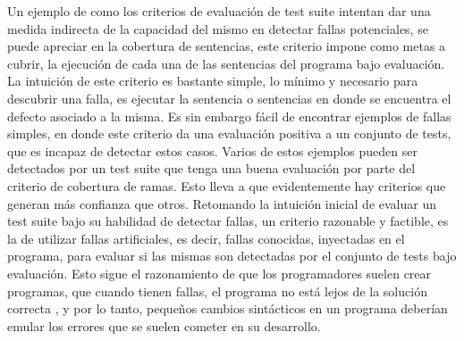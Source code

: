 Un ejemplo de como los criterios de evaluaci\'on de test suite intentan dar una medida indirecta de la capacidad del mismo en detectar fallas potenciales, se puede apreciar en la cobertura de sentencias, este criterio impone como metas a cubrir, la ejecuci\'on de cada una de las sentencias del programa bajo evaluaci\'on. La intuici\'on de este criterio es bastante simple, lo m\'inimo y necesario para descubrir una falla, es ejecutar la sentencia o sentencias en donde se encuentra el defecto asociado a la misma. Es sin embargo f\'acil de encontrar ejemplos de fallas simples, en donde este criterio da una evaluaci\'on positiva a un conjunto de tests, que es incapaz de detectar estos casos. Varios de estos ejemplos pueden ser detectados por un test suite que tenga una buena evaluaci\'on por parte del criterio de cobertura de ramas. Esto lleva a que evidentemente hay criterios que generan m\'as confianza que otros. Retomando la intuici\'on inicial de evaluar un test suite bajo su habilidad de detectar fallas, un criterio razonable y factible, es la de utilizar fallas artificiales, es decir, fallas conocidas, inyectadas en el programa, para evaluar si las mismas son detectadas por el conjunto de tests bajo evaluaci\'on. Esto sigue el razonamiento de que los programadores suelen crear programas, que cuando tienen fallas, el programa no est\'a lejos de la soluci\'on correcta \cite{bibliography.mutation.DeMillo}, y por lo tanto, peque\~nos cambios sint\'acticos en un programa deber\'ian emular los errores que se suelen cometer en su desarrollo.

